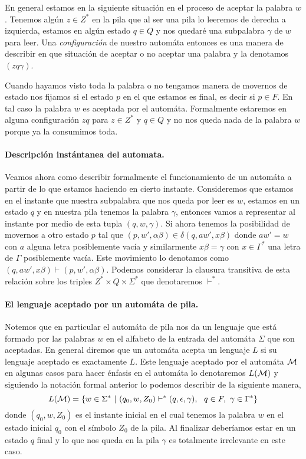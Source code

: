 \documentclass[tesis.tex]{subfiles}
\begin{document}
En general estamos en la siguiente situación en el proceso de aceptar la palabra $w$. Tenemos algún $z \in Z^{*}$ en la pila que al ser una pila lo leeremos de derecha a izquierda, estamos en algún estado $q \in Q$ y nos quedaré una subpalabra $\gamma$ de $w$ para leer. Una \textit{configuración} de nuestro automáta entonces es una manera de describir en que situación de aceptar o no aceptar una palabra y la denotamos $(zq\gamma)$. 

Cuando hayamos visto toda la palabra o no tengamos manera de movernos de estado nos fijamos si el estado $p$ en el que estamos es final, es decir si $p \in F$. En tal caso la palabra $w$ es aceptada por el automáta. Formalmente estaremos en alguna configuración $zq$ para $z \in Z^*$ y $q \in Q$ y no nos queda nada de la palabra $w$ porque ya la consumimos toda.

\paragraph{Descripción instántanea del automata.} Veamos ahora como describir formalmente el funcionamiento de un automáta a partir de lo que estamos haciendo en cierto instante. 
Consideremos que estamos en el instante que nuestra subpalabra que nos queda por leer es $w$, estamos en un estado $q$ y en nuestra pila tenemos la palabra $\gamma$, entonces vamos a representar al instante por medio de esta tupla $(q,w,\gamma)$.
Si ahora tenemos la posibilidad de movernos a otro estado $p$ tal que $(p,w',\alpha\beta) \in \delta (q,aw',x\beta)$ donde $aw' = w$ con $a$ alguna letra posiblemente vacía y similarmente $x \beta = \gamma$ con $x \in \Gamma^*$ una letra de $\Gamma$ posiblemente vacía. Este movimiento lo denotamos como $(q,aw',x\beta) \vdash (p,w',\alpha \beta)$. Podemos considerar la clausura transitiva de esta relación sobre los triples $Z^* \times Q \times \Sigma^*$ que denotaremos $\vdash^*$.


\paragraph{El lenguaje aceptado por un automáta de pila.} Notemos que en particular el automáta de pila nos da un lenguaje que está formado por las palabras $w$ en el alfabeto de la entrada del automáta $\Sigma$ que son aceptadas. En general diremos que un automáta acepta un lenguaje $L$ si su lenguaje aceptado es exactamente $L$. Este lenguaje aceptado por el automáta $\cal M$ en algunas casos para hacer énfasis en el automáta lo denotaremos $L {(\cal M)}$ y siguiendo la notación formal anterior lo podemos describir de la siguiente manera,
\begin{equation*}
	L( {\cal M}) = \{ w \in \Sigma^* \ | \ (q_0,w,Z_0) \vdash^* (q, \epsilon, \gamma), \ \ q \in F, \ \gamma \in \Gamma^*      \}
\end{equation*}
donde $(q_0, w, Z_0)$ es el instante inicial en el cual tenemos la palabra $w$ en el estado inicial $q_0$ con el símbolo $Z_0$ de la pila. Al finalizar deberíamos estar en un estado $q$ final y lo que nos queda en la pila $\gamma$ es totalmente irrelevante en este caso.
\end{document}
